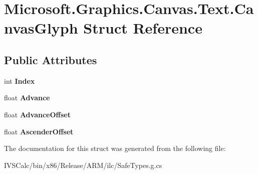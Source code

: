 \hypertarget{struct_microsoft_1_1_graphics_1_1_canvas_1_1_text_1_1_canvas_glyph}{}\section{Microsoft.\+Graphics.\+Canvas.\+Text.\+Canvas\+Glyph Struct Reference}
\label{struct_microsoft_1_1_graphics_1_1_canvas_1_1_text_1_1_canvas_glyph}
\subsection*{Public Attributes}
\begin{DoxyCompactItemize}
\item 
\mbox{\label{struct_microsoft_1_1_graphics_1_1_canvas_1_1_text_1_1_canvas_glyph_add59fdf315c899e219f5d1774dc6b841}} 
int {\bfseries Index}
\item 
\mbox{\label{struct_microsoft_1_1_graphics_1_1_canvas_1_1_text_1_1_canvas_glyph_a0530b72fc740f4c5c6f0c308e7b09b28}} 
float {\bfseries Advance}
\item 
\mbox{\label{struct_microsoft_1_1_graphics_1_1_canvas_1_1_text_1_1_canvas_glyph_a8a4be42e596d4b76db5935725e0704af}} 
float {\bfseries Advance\+Offset}
\item 
\mbox{\label{struct_microsoft_1_1_graphics_1_1_canvas_1_1_text_1_1_canvas_glyph_ae1bf91c67a353ec84d14ad8c46218881}} 
float {\bfseries Ascender\+Offset}
\end{DoxyCompactItemize}


The documentation for this struct was generated from the following file\+:\begin{DoxyCompactItemize}
\item 
I\+V\+S\+Calc/bin/x86/\+Release/\+A\+R\+M/ilc/Safe\+Types.\+g.\+cs\end{DoxyCompactItemize}

